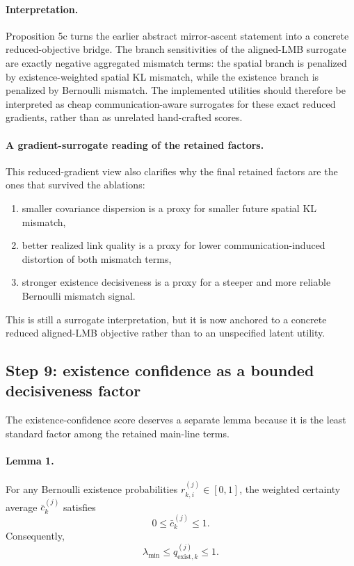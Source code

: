 \paragraph{Interpretation.}
Proposition 5c turns the earlier abstract mirror-ascent statement into a concrete reduced-objective bridge. The branch sensitivities of the aligned-LMB surrogate are exactly negative aggregated mismatch terms: the spatial branch is penalized by existence-weighted spatial KL mismatch, while the existence branch is penalized by Bernoulli mismatch. The implemented utilities should therefore be interpreted as cheap communication-aware surrogates for these exact reduced gradients, rather than as unrelated hand-crafted scores.

\paragraph{A gradient-surrogate reading of the retained factors.}
This reduced-gradient view also clarifies why the final retained factors are the ones that survived the ablations:
\begin{enumerate}
\item smaller covariance dispersion is a proxy for smaller future spatial KL mismatch,
\item better realized link quality is a proxy for lower communication-induced distortion of both mismatch terms,
\item stronger existence decisiveness is a proxy for a steeper and more reliable Bernoulli mismatch signal.
\end{enumerate}
This is still a surrogate interpretation, but it is now anchored to a concrete reduced aligned-LMB objective rather than to an unspecified latent utility.

\subsection*{Step 9: existence confidence as a bounded decisiveness factor}

The existence-confidence score deserves a separate lemma because it is the least standard factor among the retained main-line terms.

\paragraph{Lemma 1.}
For any Bernoulli existence probabilities $r_{k,i}^{(j)} \in [0,1]$, the weighted certainty average $\bar c_k^{(j)}$ satisfies
\begin{equation}
0 \le \bar c_k^{(j)} \le 1.
\end{equation}
Consequently,
\begin{equation}
\lambda_{\min} \le q_{\mathrm{exist},k}^{(j)} \le 1.
\end{equation}

